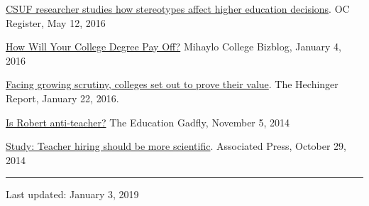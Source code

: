 \documentclass[11pt,a4paper]{article}
\begin{document}
\href{http://www.ocregister.com/articles/college-715504-students-klein.html}{CSUF researcher studies how stereotypes affect higher education decisions}. OC Register, May 12, 2016



\href{https://bizblogs.fullerton.edu/blog/2016/01/04/how-will-your-college-degree-pay-off/}{How Will Your College Degree Pay Off?} Mihaylo College Bizblog, January 4, 2016



\href{http://hechingerreport.org/25399-2/}{Facing growing scrutiny, colleges set out to prove their value}. The Hechinger Report, January 22, 2016.



\href{https://edexcellence.net/commentary/podcasts/is-robert-anti-teacher}{Is Robert anti-teacher?} The Education Gadfly, November 5, 2014



\href{http://komonews.com/news/local/study-teacher-hiring-should-be-more-scientific}{Study: Teacher hiring should be more scientific}. Associated Press, October 29, 2014



\vspace{1cm} \hrule \vspace{1cm}





Last updated: January 3, 2019
\end{document}

